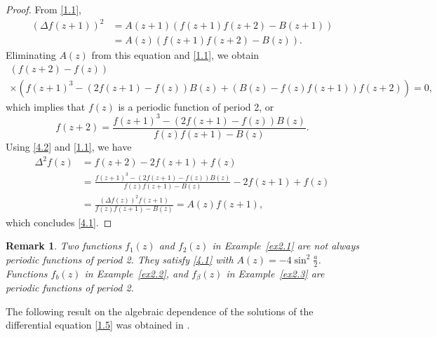 \documentclass{amsart}
\newtheorem{remark}[theorem]{Remark}
\begin{document}

\begin{proof}
From \eqref{1.1},
\begin{align*}
(\Delta f(z+1))^2&=A(z+1)(f(z+1)f(z+2)-B(z+1))\\
&=A(z)(f(z+1)f(z+2)-B(z)).
\end{align*}
Eliminating $A(z)$ from this equation and \eqref{1.1}, we obtain
\begin{multline*}
(f(z+2)-f(z))\\
\times \left(f(z+1)^3-(2f(z+1)-f(z))B(z)+(B(z)-f(z)f(z+1))f(z+2)\right)=0,
\end{multline*}
which implies that $f(z)$ is a periodic function of period 2, or
\begin{equation}
f(z+2)=\frac{f(z+1)^3-(2f(z+1)-f(z))B(z)}{f(z)f(z+1)-B(z)}.\label{4.2}
\end{equation}
Using \eqref{4.2} and \eqref{1.1}, we have
\begin{align*}
\Delta^2 f(z)&=f(z+2)-2f(z+1)+f(z)\\
&=\frac{f(z+1)^3-(2f(z+1)-f(z))B(z)}{f(z)f(z+1)-B(z)}-2f(z+1)+f(z)\\
&=\frac{(\Delta f(z))^2f(z+1)}{f(z)f(z+1)-B(z)}=A(z)f(z+1),
\end{align*}
which concludes \eqref{4.1}.
\end{proof}


\begin{remark}\label{rem4.1} Two functions $f_1(z)$ and $f_2(z)$
in Example~\ref{ex2.1} are not always periodic
functions of period 2. They satisfy \eqref{4.1} with $A(z)=-4\sin^2\frac{a}{2}$.
Functions $f_b(z)$ in Example~\ref{ex2.2}, and $f_\beta(z)$ in Example~\ref{ex2.3} are periodic functions of period 2.
\end{remark}

The following result on the algebraic dependence of the solutions of the differential equation \eqref{1.5} was obtained in \cite[Theorem~2.1]{ishizakit:07}.




%
\end{document}

